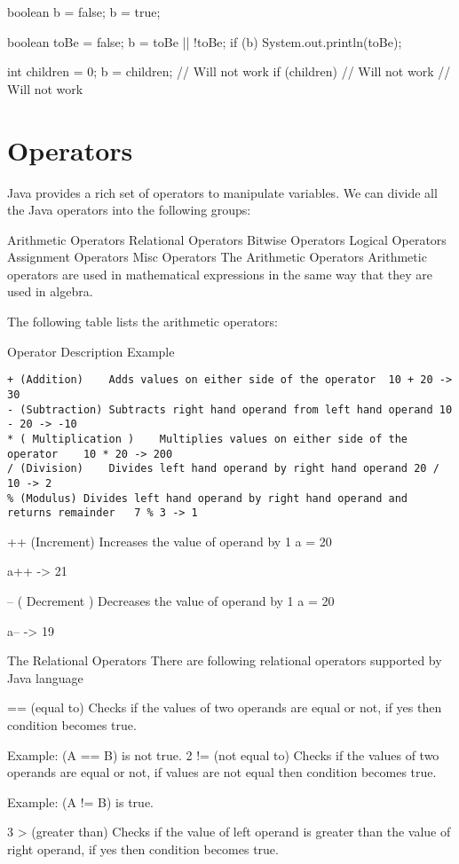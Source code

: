 boolean b = false;
b = true;

boolean toBe = false;
b = toBe || !toBe;
if (b) {
    System.out.println(toBe);
}

int children = 0;
b = children; // Will not work
if (children) { // Will not work
    // Will not work
}

\section{Operators}
Java provides a rich set of operators to manipulate variables. We can divide all the Java operators into the following groups:

Arithmetic Operators
Relational Operators
Bitwise Operators
Logical Operators
Assignment Operators
Misc Operators
The Arithmetic Operators
Arithmetic operators are used in mathematical expressions in the same way that they are used in algebra.

The following table lists the arithmetic operators:

Operator	Description	Example

\begin{lstlisting}
+ (Addition)	Adds values on either side of the operator	10 + 20 -> 30
- (Subtraction)	Subtracts right hand operand from left hand operand	10 - 20 -> -10
* ( Multiplication )	Multiplies values on either side of the operator	10 * 20 -> 200
/ (Division)	Divides left hand operand by right hand operand	20 / 10 -> 2
% (Modulus)	Divides left hand operand by right hand operand and returns remainder	7 % 3 -> 1
\end{lstlisting}

++ (Increment)	Increases the value of operand by 1
a = 20

a++ -> 21

-- ( Decrement )	Decreases the value of operand by 1
a = 20

a-- -> 19

The Relational Operators
There are following relational operators supported by Java language

== (equal to) Checks if the values of two operands are equal or not, if yes then condition becomes true.

Example: (A == B) is not true. 2 != (not equal to) Checks if the values of two operands are equal or not, if values are not equal then condition becomes true.

Example: (A != B) is true.

3 > (greater than) Checks if the value of left operand is greater than the value of right operand, if yes then condition becomes true.

